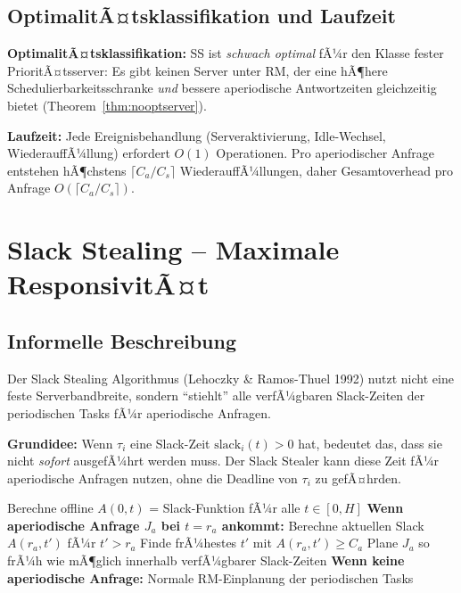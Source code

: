 ﻿\documentclass[a4paper,12pt]{report}
\theoremstyle{definition}
\begin{document}
\subsection{OptimalitÃ¤tsklassifikation und Laufzeit}

\textbf{OptimalitÃ¤tsklassifikation:} SS ist \emph{schwach optimal} fÃ¼r den
Klasse fester PrioritÃ¤tsserver: Es gibt keinen Server unter RM, der eine
hÃ¶here Schedulierbarkeitsschranke \emph{und} bessere aperiodische Antwortzeiten
gleichzeitig bietet (Theorem~\ref{thm:nooptserver}).

\textbf{Laufzeit:} Jede Ereignisbehandlung (Serveraktivierung, Idle-Wechsel,
WiederauffÃ¼llung) erfordert $O(1)$ Operationen. Pro aperiodischer Anfrage
entstehen hÃ¶chstens $\lceil C_a/C_s \rceil$ WiederauffÃ¼llungen, daher
Gesamtoverhead pro Anfrage $O(\lceil C_a/C_s \rceil)$.

\section{Slack Stealing -- Maximale ResponsivitÃ¤t}

\subsection{Informelle Beschreibung}

Der Slack Stealing Algorithmus (Lehoczky \& Ramos-Thuel 1992) nutzt nicht
eine feste Serverbandbreite, sondern ``stiehlt'' alle verfÃ¼gbaren Slack-Zeiten
der periodischen Tasks fÃ¼r aperiodische Anfragen.

\textbf{Grundidee:} Wenn $\tau_i$ eine Slack-Zeit $\text{slack}_i(t) > 0$ hat,
bedeutet das, dass sie nicht \emph{sofort} ausgefÃ¼hrt werden muss. Der
Slack Stealer kann diese Zeit fÃ¼r aperiodische Anfragen nutzen, ohne die
Deadline von $\tau_i$ zu gefÃ¤hrden.

\begin{algorithm}[H]
	\caption{Slack Stealing (vereinfachte Darstellung)}
	\begin{algorithmic}[1]
		\State Berechne offline $A(0, t)$ = Slack-Funktion fÃ¼r alle $t \in [0, H]$
		\State
		\State \textbf{Wenn aperiodische Anfrage $J_a$ bei $t=r_a$ ankommt:}
		\State Berechne aktuellen Slack $A(r_a, t')$ fÃ¼r $t' > r_a$
		\State Finde frÃ¼hestes $t'$ mit $A(r_a, t') \geq C_a$
		\State Plane $J_a$ so frÃ¼h wie mÃ¶glich innerhalb verfÃ¼gbarer Slack-Zeiten
		\State
		\State \textbf{Wenn keine aperiodische Anfrage:}
		\State Normale RM-Einplanung der periodischen Tasks
	\end{algorithmic}
\end{algorithm}
\end{document}
